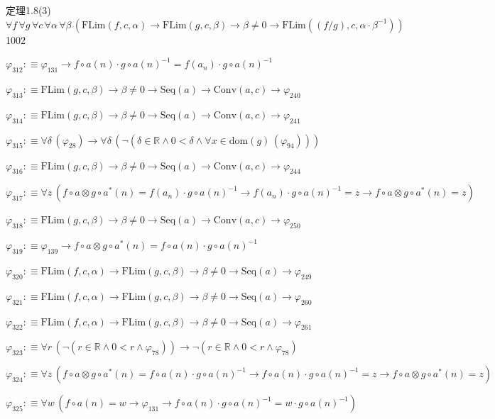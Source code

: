 \begin{fullproof}{定理1.8(3)}{$\forall f\,\forall g\,\forall c\,\forall \alpha\,\forall \beta\,(\mathrm{FLim}(f,c,\alpha) \to \mathrm{FLim}(g,c,\beta) \to \beta \neq 0 \to \mathrm{FLim}((f / g),c,\alpha \cdot \beta^{-1}))$}{1002}
\begin{abbrevlist}
\item $\varphi_{312} :\equiv \varphi_{131} \to f \circ a(n) \cdot g \circ a(n)^{-1} = f(a_{n}) \cdot g \circ a(n)^{-1}$
\item $\varphi_{313} :\equiv \mathrm{FLim}(g,c,\beta) \to \beta \neq 0 \to \mathrm{Seq}(a) \to \mathrm{Conv}(a,c) \to \varphi_{240}$
\item $\varphi_{314} :\equiv \mathrm{FLim}(g,c,\beta) \to \beta \neq 0 \to \mathrm{Seq}(a) \to \mathrm{Conv}(a,c) \to \varphi_{241}$
\item $\varphi_{315} :\equiv \forall \delta\,(\varphi_{28}) \to \forall \delta\,(\neg (\delta \in \mathbb{R} \land 0 < \delta \land \forall x \in \mathrm{dom}(g)\,(\varphi_{94})))$
\item $\varphi_{316} :\equiv \mathrm{FLim}(g,c,\beta) \to \beta \neq 0 \to \mathrm{Seq}(a) \to \mathrm{Conv}(a,c) \to \varphi_{244}$
\item $\varphi_{317} :\equiv \forall z\,(f \circ a \otimes g \circ a^{\ast}(n) = f(a_{n}) \cdot g \circ a(n)^{-1} \to f(a_{n}) \cdot g \circ a(n)^{-1} = z \to f \circ a \otimes g \circ a^{\ast}(n) = z)$
\item $\varphi_{318} :\equiv \mathrm{FLim}(g,c,\beta) \to \beta \neq 0 \to \mathrm{Seq}(a) \to \mathrm{Conv}(a,c) \to \varphi_{250}$
\item $\varphi_{319} :\equiv \varphi_{139} \to f \circ a \otimes g \circ a^{\ast}(n) = f \circ a(n) \cdot g \circ a(n)^{-1}$
\item $\varphi_{320} :\equiv \mathrm{FLim}(f,c,\alpha) \to \mathrm{FLim}(g,c,\beta) \to \beta \neq 0 \to \mathrm{Seq}(a) \to \varphi_{249}$
\item $\varphi_{321} :\equiv \mathrm{FLim}(f,c,\alpha) \to \mathrm{FLim}(g,c,\beta) \to \beta \neq 0 \to \mathrm{Seq}(a) \to \varphi_{260}$
\item $\varphi_{322} :\equiv \mathrm{FLim}(f,c,\alpha) \to \mathrm{FLim}(g,c,\beta) \to \beta \neq 0 \to \mathrm{Seq}(a) \to \varphi_{261}$
\item $\varphi_{323} :\equiv \forall r\,(\neg (r \in \mathbb{R} \land 0 < r \land \varphi_{78})) \to \neg (r \in \mathbb{R} \land 0 < r \land \varphi_{78})$
\item $\varphi_{324} :\equiv \forall z\,(f \circ a \otimes g \circ a^{\ast}(n) = f \circ a(n) \cdot g \circ a(n)^{-1} \to f \circ a(n) \cdot g \circ a(n)^{-1} = z \to f \circ a \otimes g \circ a^{\ast}(n) = z)$
\item $\varphi_{325} :\equiv \forall w\,(f \circ a(n) = w \to \varphi_{131} \to f \circ a(n) \cdot g \circ a(n)^{-1} = w \cdot g \circ a(n)^{-1})$

\end{abbrevlist}
\end{fullproof}
